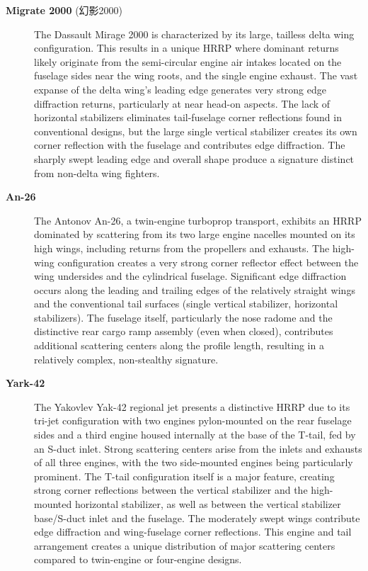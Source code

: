 {\begin{description}
    \item[\textbf{Migrate 2000} (幻影2000)]
    The Dassault Mirage 2000 is characterized by its large, tailless delta wing configuration. This results in a unique HRRP where dominant returns likely originate from the semi-circular engine air intakes located on the fuselage sides near the wing roots, and the single engine exhaust. The vast expanse of the delta wing's leading edge generates very strong edge diffraction returns, particularly at near head-on aspects. The lack of horizontal stabilizers eliminates tail-fuselage corner reflections found in conventional designs, but the large single vertical stabilizer creates its own corner reflection with the fuselage and contributes edge diffraction. The sharply swept leading edge and overall shape produce a signature distinct from non-delta wing fighters.

    \item[\textbf{An-26}]
    The Antonov An-26, a twin-engine turboprop transport, exhibits an HRRP dominated by scattering from its two large engine nacelles mounted on its high wings, including returns from the propellers and exhausts. The high-wing configuration creates a very strong corner reflector effect between the wing undersides and the cylindrical fuselage. Significant edge diffraction occurs along the leading and trailing edges of the relatively straight wings and the conventional tail surfaces (single vertical stabilizer, horizontal stabilizers). The fuselage itself, particularly the nose radome and the distinctive rear cargo ramp assembly (even when closed), contributes additional scattering centers along the profile length, resulting in a relatively complex, non-stealthy signature.

    \item[\textbf{Yark-42}]
    The Yakovlev Yak-42 regional jet presents a distinctive HRRP due to its tri-jet configuration with two engines pylon-mounted on the rear fuselage sides and a third engine housed internally at the base of the T-tail, fed by an S-duct inlet. Strong scattering centers arise from the inlets and exhausts of all three engines, with the two side-mounted engines being particularly prominent. The T-tail configuration itself is a major feature, creating strong corner reflections between the vertical stabilizer and the high-mounted horizontal stabilizer, as well as between the vertical stabilizer base/S-duct inlet and the fuselage. The moderately swept wings contribute edge diffraction and wing-fuselage corner reflections. This engine and tail arrangement creates a unique distribution of major scattering centers compared to twin-engine or four-engine designs.


\end{description}}
